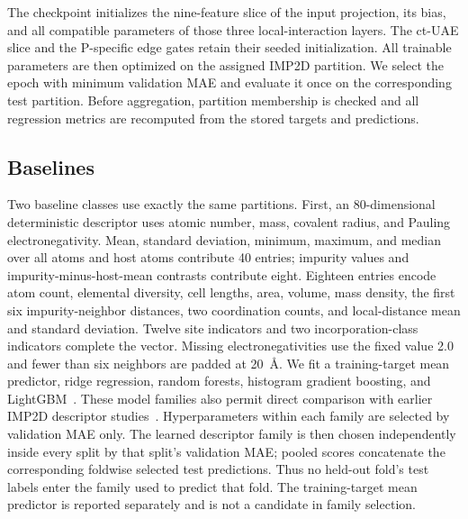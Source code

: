 The checkpoint initializes the nine-feature slice of the input projection, its
bias, and all compatible parameters of those three local-interaction layers.
The ct-UAE slice and the P-specific edge gates retain their seeded
initialization.  All trainable parameters are then optimized on the assigned
IMP2D partition.  We select the epoch with minimum validation MAE and evaluate
it once on the corresponding test partition.  Before aggregation, partition
membership is checked and all regression metrics are recomputed from the stored
targets and predictions.

\subsection{Baselines}
\label{sec:baselines}

Two baseline classes use exactly the same partitions.  First, an
80-dimensional deterministic descriptor uses atomic number, mass, covalent
radius, and Pauling electronegativity.  Mean, standard deviation, minimum,
maximum, and median over all atoms and host atoms contribute 40 entries;
impurity values and impurity-minus-host-mean contrasts contribute eight.
Eighteen entries encode atom count, elemental diversity, cell lengths, area,
volume, mass density, the first six impurity-neighbor distances, two
coordination counts, and local-distance mean and standard deviation.  Twelve
site indicators and two incorporation-class indicators complete the vector.
Missing electronegativities use the fixed value 2.0 and fewer than six
neighbors are padded at 20~\AA.  We fit a training-target mean predictor, ridge
regression, random forests, histogram gradient boosting, and
LightGBM~\cite{ke2017lightgbm}.  These model families also permit direct
comparison with earlier IMP2D descriptor studies~\cite{kesorn2024,
elalouani2026}.  Hyperparameters within each family are selected by validation
MAE only.  The learned descriptor family is then chosen independently inside
every split by that split's validation MAE; pooled scores concatenate the
corresponding foldwise selected test predictions.  Thus no held-out fold's
test labels enter the family used to predict that fold.  The training-target
mean predictor is reported separately and is not a candidate in family
selection.

